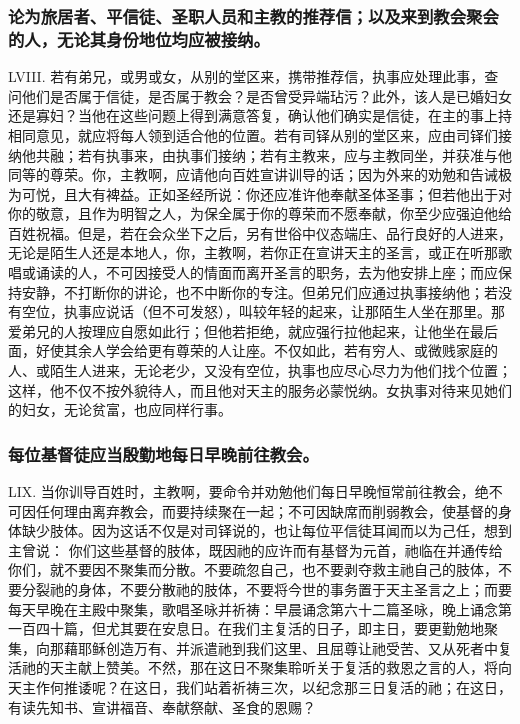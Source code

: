 
\subsubsection{论为旅居者、平信徒、圣职人员和主教的推荐信；以及来到教会聚会的人，无论其身份地位均应被接纳。}

LVIII. 若有弟兄，或男或女，从别的堂区来，携带推荐信，执事应处理此事，查问他们是否属于信徒，是否属于教会？是否曾受异端玷污？此外，该人是已婚妇女还是寡妇？当他在这些问题上得到满意答复，确认他们确实是信徒，在主的事上持相同意见，就应将每人领到适合他的位置。若有司铎从别的堂区来，应由司铎们接纳他共融；若有执事来，由执事们接纳；若有主教来，应与主教同坐，并获准与他同等的尊荣。你，主教啊，应请他向百姓宣讲训导的话；因为外来的劝勉和告诫极为可悦，且大有裨益。正如圣经所说：你还应准许他奉献圣体圣事；但若他出于对你的敬意，且作为明智之人，为保全属于你的尊荣而不愿奉献，你至少应强迫他给百姓祝福。但是，若在会众坐下之后，另有世俗中仪态端庄、品行良好的人进来，无论是陌生人还是本地人，你，主教啊，若你正在宣讲天主的圣言，或正在听那歌唱或诵读的人，不可因接受人的情面而离开圣言的职务，去为他安排上座；而应保持安静，不打断你的讲论，也不中断你的专注。但弟兄们应通过执事接纳他；若没有空位，执事应说话（但不可发怒），叫较年轻的起来，让那陌生人坐在那里。那爱弟兄的人按理应自愿如此行；但他若拒绝，就应强行拉他起来，让他坐在最后面，好使其余人学会给更有尊荣的人让座。不仅如此，若有穷人、或微贱家庭的人、或陌生人进来，无论老少，又没有空位，执事也应尽心尽力为他们找个位置；这样，他不仅不按外貌待人，而且他对天主的服务必蒙悦纳。女执事对待来见她们的妇女，无论贫富，也应同样行事。\par


\subsubsection{每位基督徒应当殷勤地每日早晚前往教会。}

LIX. 当你训导百姓时，主教啊，要命令并劝勉他们每日早晚恒常前往教会，绝不可因任何理由离弃教会，而要持续聚在一起；不可因缺席而削弱教会，使基督的身体缺少肢体。因为这话不仅是对司铎说的，也让每位平信徒耳闻而以为己任，想到主曾说： 你们这些基督的肢体，既因祂的应许而有基督为元首，祂临在并通传给你们，就不要因不聚集而分散。不要疏忽自己，也不要剥夺救主祂自己的肢体，不要分裂祂的身体，不要分散祂的肢体，不要将今世的事务置于天主圣言之上；而要每天早晚在主殿中聚集，歌唱圣咏并祈祷：早晨诵念第六十二篇圣咏，晚上诵念第一百四十篇，但尤其要在安息日。在我们主复活的日子，即主日，要更勤勉地聚集，向那藉耶稣创造万有、并派遣祂到我们这里、且屈尊让祂受苦、又从死者中复活祂的天主献上赞美。不然，那在这日不聚集聆听关于复活的救恩之言的人，将向天主作何推诿呢？在这日，我们站着祈祷三次，以纪念那三日复活的祂；在这日，有读先知书、宣讲福音、奉献祭献、圣食的恩赐？\par

